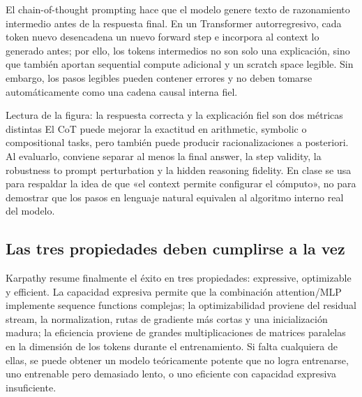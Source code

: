 El chain-of-thought prompting hace que el modelo genere texto de razonamiento intermedio antes de la respuesta final. En un Transformer autorregresivo, cada token nuevo desencadena un nuevo forward step e incorpora al context lo generado antes; por ello, los tokens intermedios no son solo una explicación, sino que también aportan sequential compute adicional y un scratch space legible. Sin embargo, los pasos legibles pueden contener errores y no deben tomarse automáticamente como una cadena causal interna fiel.


\begin{warningbox}{Lectura de la figura: la respuesta correcta y la explicación fiel son dos métricas distintas}
El CoT puede mejorar la exactitud en arithmetic, symbolic o compositional tasks, pero también puede producir racionalizaciones a posteriori. Al evaluarlo, conviene separar al menos la final answer, la step validity, la robustness to prompt perturbation y la hidden reasoning fidelity. En clase se usa para respaldar la idea de que «el context permite configurar el cómputo», no para demostrar que los pasos en lenguaje natural equivalen al algoritmo interno real del modelo.
\end{warningbox}

\subsection{Las tres propiedades deben cumplirse a la vez}

Karpathy resume finalmente el éxito en tres propiedades: expressive, optimizable y efficient. La capacidad expresiva permite que la combinación attention/MLP implemente sequence functions complejas; la optimizabilidad proviene del residual stream, la normalization, rutas de gradiente más cortas y una inicialización madura; la eficiencia proviene de grandes multiplicaciones de matrices paralelas en la dimensión de los tokens durante el entrenamiento. Si falta cualquiera de ellas, se puede obtener un modelo teóricamente potente que no logra entrenarse, uno entrenable pero demasiado lento, o uno eficiente con capacidad expresiva insuficiente.


